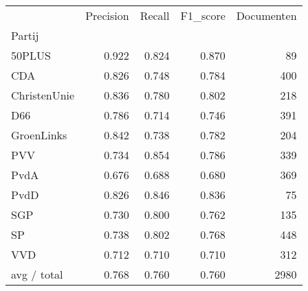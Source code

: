 \begin{tabular}{lrrrr}
\toprule
{} &  Precision &  Recall &  F1\_score &  Documenten \\
Partij       &            &         &           &             \\
\midrule
50PLUS       &      0.922 &   0.824 &     0.870 &          89 \\
   CDA       &      0.826 &   0.748 &     0.784 &         400 \\
ChristenUnie &      0.836 &   0.780 &     0.802 &         218 \\
   D66       &      0.786 &   0.714 &     0.746 &         391 \\
  GroenLinks &      0.842 &   0.738 &     0.782 &         204 \\
   PVV       &      0.734 &   0.854 &     0.786 &         339 \\
  PvdA       &      0.676 &   0.688 &     0.680 &         369 \\
  PvdD       &      0.826 &   0.846 &     0.836 &          75 \\
   SGP       &      0.730 &   0.800 &     0.762 &         135 \\
    SP       &      0.738 &   0.802 &     0.768 &         448 \\
   VVD       &      0.712 &   0.710 &     0.710 &         312 \\
 avg / total &      0.768 &   0.760 &     0.760 &        2980 \\
\bottomrule
\end{tabular}
